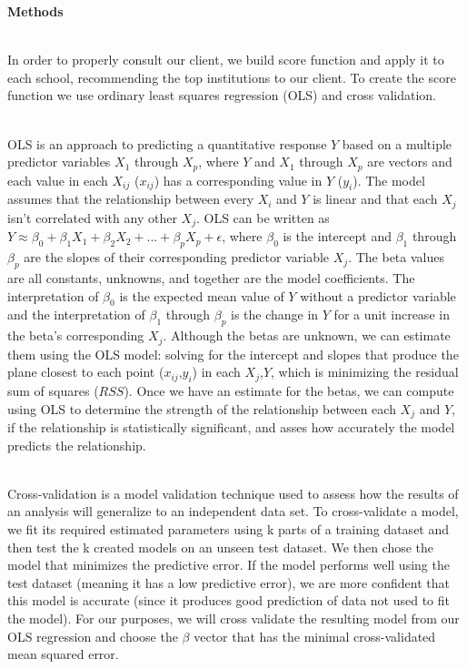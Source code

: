 \documentclass{article}
\begin{document}


{\large\textbf{Methods}} \\\

In order to properly consult our client, we build score function and apply it to each school, recommending the top institutions to our client. To create the score function we use ordinary least squares regression (OLS) and cross validation. \\\

OLS is an approach to predicting a quantitative response $Y$ based on a multiple predictor variables $X_1$ through $X_p$, where $Y$ and $X_1$ through $X_p$ are vectors and each value in each $X_{ij}$ ($x_{ij}$) has a corresponding value in $Y$ ($y_i$). The model assumes that the relationship between every $X_i$ and $Y$ is linear and that each $X_j$ isn't correlated with any other $X_j$. OLS can be written as $Y \approx \beta_0 + \beta_1X_1 + \beta_2X_2 + ... + \beta_pX_p + \epsilon$, where $\beta_0$ is the intercept and $\beta_1$ through $\beta_p$ are the slopes of their corresponding predictor variable $X_j$. The beta values are all constants, unknowns, and together are the model coefficients. The interpretation of $\beta_0$ is the expected mean value of $Y$ without a predictor variable and the interpretation of $\beta_1$ through $\beta_p$ is the change in $Y$ for a unit increase in the beta's corresponding $X_j$. Although the betas are unknown, we can estimate them using the OLS model: solving for the intercept and slopes that produce the plane closest to each point ($x_{ij}$,$y_i$) in each $X_j$,$Y$, which is minimizing the residual sum of squares ($RSS$). Once we have an estimate for the betas, we can compute using OLS to determine the strength of the relationship between each $X_j$ and $Y$, if the relationship is statistically significant, and asses how accurately the model predicts the relationship. \\\

Cross-validation is a model validation technique used to assess how the results of an analysis will generalize to an independent data set. To cross-validate a model, we fit its required estimated parameters using k parts of a training dataset and then test the k created models on an unseen test dataset. We then chose the model that minimizes the predictive error. If the model performs well using the test dataset (meaning it has a low predictive error), we are more confident that this model is accurate (since it produces good prediction of data not used to fit the model). For our purposes, we will cross validate the resulting model from our OLS regression and choose the $\beta$ vector that has the minimal cross-validated mean squared error.
\end{document}
